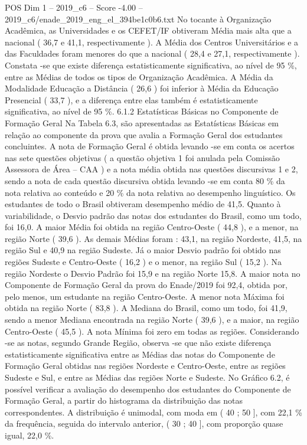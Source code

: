 \begin{textsample}{POS Dim 1 – 2019\_c6 – Score -4.00 – 2019\_c6/enade\_2019\_eng\_el\_394be1c0b6.txt}
No tocante à Organização Acadêmica, as Universidades e os CEFET/IF obtiveram Média mais alta que a nacional ( 36,7 e 41,1, respectivamente ).
A Média dos Centros Universitários e a das Faculdades foram menores do que a nacional ( 28,4 e 27,1, respectivamente ).
Constata -se que existe diferença estatisticamente significativa, ao nível de 95 \%, entre as Médias de todos os tipos de Organização Acadêmica.
A Média da Modalidade Educação a Distância ( 26,6 ) foi inferior à Média da Educação Presencial ( 33,7 ), e a diferença entre elas também é estatisticamente significativa, ao nível de 95 \%. 6.1.2 Estatísticas Básicas no Componente de Formação Geral Na Tabela 6.3, são apresentadas as Estatísticas Básicas em relação ao componente da prova que avalia a Formação Geral dos estudantes concluintes.
A nota de Formação Geral é obtida levando -se em conta os acertos nas sete questões objetivas ( a questão objetiva 1 foi anulada pela Comissão Assessora de Área – CAA ) e a nota média obtida nas questões discursivas 1 e 2, sendo a nota de cada questão discursiva obtida levando -se em conta 80 \% da nota relativa ao conteúdo e 20 \% da nota relativa ao desempenho linguístico.
Os estudantes de todo o Brasil obtiveram desempenho médio de 41,5.
Quanto à variabilidade, o Desvio padrão das notas dos estudantes do Brasil, como um todo, foi 16,0.
A maior Média foi obtida na região Centro-Oeste ( 44,8 ), e a menor, na região Norte ( 39,6 ).
As demais Médias foram : 43,1, na região Nordeste, 41,5, na região Sul e 40,9 na região Sudeste.
Já o maior Desvio padrão foi obtido nas regiões Sudeste e Centro-Oeste ( 16,2 ) e o menor, na região Sul ( 15,2 ).
Na região Nordeste o Desvio Padrão foi 15,9 e na região Norte 15,8.
A maior nota no Componente de Formação Geral da prova do Enade/2019 foi 92,4, obtida por, pelo menos, um estudante na região Centro-Oeste.
A menor nota Máxima foi obtida na região Norte ( 83,8 ).
A Mediana do Brasil, como um todo, foi 41,9, sendo a menor Mediana encontrada na região Norte ( 39,6 ), e a maior, na região Centro-Oeste ( 45,5 ).
A nota Mínima foi zero em todas as regiões.
Considerando -se as notas, segundo Grande Região, observa -se que não existe diferença estatisticamente significativa entre as Médias das notas do Componente de Formação Geral obtidas nas regiões Nordeste e Centro-Oeste, entre as regiões Sudeste e Sul, e entre as Médias das regiões Norte e Sudeste.
No Gráfico 6.2, é possível verificar a avaliação do desempenho dos estudantes do Componente de Formação Geral, a partir do histograma da distribuição das notas correspondentes.
A distribuição é unimodal, com moda em ( 40 ; 50 ], com 22,1 \% da frequência, seguida do intervalo anterior, ( 30 ; 40 ], com proporção quase igual, 22,0 \%.

\end{textsample}
